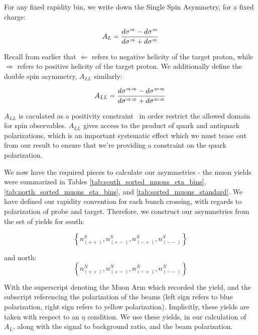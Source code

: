 For any fixed rapidity bin, we write down the Single Spin Asymmetry, for a fixed
charge:

\begin{equation}
  A_L = {
    {d\sigma^{\Rightarrow} - d\sigma^{\Leftarrow}}
    \over
    {d\sigma^{\Rightarrow} + d\sigma^{\Leftarrow}}
  }
\end{equation}

Recall from earlier that $\Leftarrow$ refers to negative helicity of the target
proton, while $\Rightarrow$ refers to positive helicity of the target proton. We
additionally define the double spin asymmetry, $A_{LL}$ similarly:

\begin{equation}
  A_{LL} = {
    {d\sigma^{\Rightarrow\Rightarrow}-d\sigma^{\Leftarrow\Rightarrow}}
    \over
    {d\sigma^{\Rightarrow\Rightarrow}+d\sigma^{\Leftarrow\Rightarrow}}
  }
\end{equation}

$A_{LL}$ is caculated as a positivity constraint~\cite{Kang2011} in order
restrict the allowed domain for spin observables. $A_{LL}$ gives access to the
product of quark and antiquark polarizations, which is an important systematic
effect which we must tease out from our result to ensure that we're providing a
constraint on the quark polarization.

We now have the required pieces to calculate our asymmetries - the muon yields
were summarized in Tables \ref{tab:south_sorted_muons_eta_bins},
\ref{tab:north_sorted_muons_eta_bins}, and \ref{tab:sorted_muons_standard}. We
have defined our rapidity convention for each bunch crossing, with regards to
polarization of probe and target. Therefore, we construct our asymmetries from
the set of yields for south:

\begin{equation}
  \left\{
  n_{\left(++\right)}^S,
  n_{\left(+-\right)}^S,
  n_{\left(-+\right)}^S,
  n_{\left(--\right)}^S
  \right\}
  \label{eq:muon_yield_north}
\end{equation}

and north:
\begin{equation}
  \left\{
  n_{\left(++\right)}^N,
  n_{\left(+-\right)}^N,
  n_{\left(-+\right)}^N,
  n_{\left(--\right)}^N
  \right\}
  \label{eq:muon_yield_south}
\end{equation}

With the superscript denoting the Muon Arm which recorded the yield, and the
subscript referencing the polarization of the beams (left sign refers to blue
polarization, right sign refers to yellow polarization). Implicitly, these
yields are taken with respect to an $\eta$ condition. We use these yields, in
our calculation of $A_L$, along with the signal to background ratio, and the
beam polarization.

